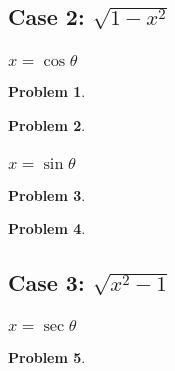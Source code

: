\documentclass{article}
\newtheorem{problem}{Problem}
\begin{document}
\subsection{Case 2: $\sqrt{1-x^2}$}
\subsubsection{$x=\cos \theta$}
\begin{problem} 

\end{problem} 


\begin{problem} 

\end{problem} 




\subsubsection{$x=\sin \theta$}
\begin{problem} 

\end{problem} 


\begin{problem} 

\end{problem} 

\subsection{Case 3: $\sqrt{x^2-1}$}
\subsubsection{$x=\sec \theta$}
\begin{problem} 

\end{problem} 

\end{document}
